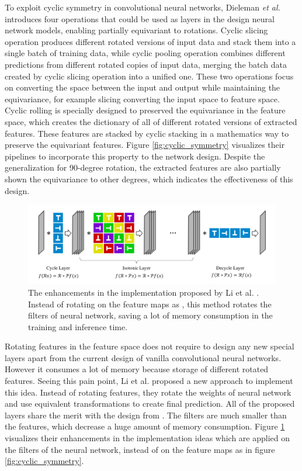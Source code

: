 To exploit cyclic symmetry in convolutional neural networks, Dieleman \textit{et al.} \cite{cyclic_symmetry} introduces four operations that could be used as layers in the design neural network models, enabling partially equivariant to rotations. Cyclic slicing operation produces different rotated versions of input data and stack them into a single batch of training data, while cyclic pooling operation combines different predictions from different rotated copies of input data, merging the batch data created by cyclic slicing operation into a unified one. These two operations focus on converting the space between the input and output while maintaining the equivariance, for example slicing converting the input space to feature space. Cyclic rolling is specially designed to preserved the equivariance in the feature space, which creates the dictionary of all of different rotated versions of extracted features. These features are stacked by cyclic stacking in a mathematics way to preserve the equivariant features. Figure \ref{fig:cyclic_symmetry} visualizes their pipelines to incorporate this property to the network design. Despite the generalization for 90-degree rotation, the extracted features are also partially shown the equivariance to other degrees, which indicates the effectiveness of this design. 

\begin{figure}[thb]
    \centering
    \includegraphics[width=\textwidth]{resources/2_dren.png}
    \caption{The enhancements in the implementation proposed by Li et al. \cite{dren}. Instead of rotating on the feature maps as \cite{cyclic_symmetry}, this method rotates the filters of neural network, saving a lot of memory consumption in the training and inference time.}
    \label{fig:dren}
\end{figure}

Rotating features in the feature space does not require to design any new special layers apart from the current design of vanilla convolutional neural networks. However it consumes a lot of memory because storage of different rotated features. Seeing this pain point, Li et al. \cite{dren} proposed a new approach to implement this idea. Instead of rotating features, they rotate the weights of neural network and use equivalent transformations to create final prediction. All of the proposed layers share the merit with the design from \cite{cyclic_symmetry}. The filters are much smaller than the features, which decrease a huge amount of memory consumption. Figure \ref{fig:dren} visualizes their enhancements in the implementation ideas which are applied on the filters of the neural network, instead of on the feature maps as in figure \ref{fig:cyclic_symmetry}.

